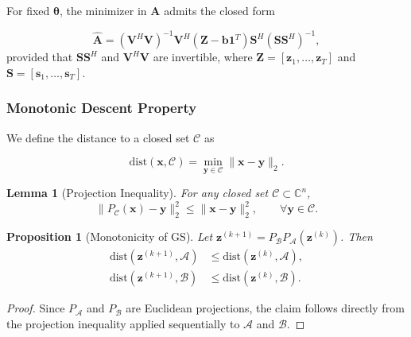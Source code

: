 \documentclass[journal]{IEEEtran}
\newtheorem{lemma}{Lemma}      %
\newtheorem{proposition}{Proposition}
\begin{document}
For fixed $\boldsymbol\theta$, the minimizer in $\mathbf A$ admits the closed
form

\begin{equation}
\hat{\mathbf A}
=
(\mathbf V^H\mathbf V)^{-1}
\mathbf V^H
(\mathbf Z-\mathbf b\mathbf 1^T)
\mathbf S^H
(\mathbf S\mathbf S^H)^{-1},
\end{equation}
provided that $\mathbf S\mathbf S^H$ and $\mathbf V^H\mathbf V$ are invertible,
where $\mathbf Z=[\mathbf z_1,\ldots,\mathbf z_T]$ and
$\mathbf S=[\mathbf s_1,\ldots,\mathbf s_T]$.

\subsubsection{Monotonic Descent Property}

We define the distance to a closed set $\mathcal C$ as

\begin{equation}
\mathrm{dist}(\mathbf x,\mathcal C)
=
\min_{\mathbf y\in\mathcal C}
\|\mathbf x-\mathbf y\|_2 .
\end{equation}

\begin{lemma}[Projection Inequality]
For any closed set $\mathcal C\subset\mathbb C^n$,
\begin{equation}
\|P_{\mathcal C}(\mathbf x)-\mathbf y\|_2^2
\le
\|\mathbf x-\mathbf y\|_2^2,
\qquad
\forall \mathbf y\in\mathcal C .
\end{equation}
\end{lemma}

\begin{proposition}[Monotonicity of GS]
Let
$\mathbf z^{(k+1)}=P_{\mathcal B}P_{\mathcal A}(\mathbf z^{(k)})$.
Then
\begin{align}
\mathrm{dist}(\mathbf z^{(k+1)},\mathcal A)
&\le
\mathrm{dist}(\mathbf z^{(k)},\mathcal A),\\
\mathrm{dist}(\mathbf z^{(k+1)},\mathcal B)
&\le
\mathrm{dist}(\mathbf z^{(k)},\mathcal B).
\end{align}
\end{proposition}

\begin{proof}
Since $P_{\mathcal A}$ and $P_{\mathcal B}$ are Euclidean projections, the claim
follows directly from the projection inequality applied sequentially to
$\mathcal A$ and $\mathcal B$.
\end{proof}
\end{document}
